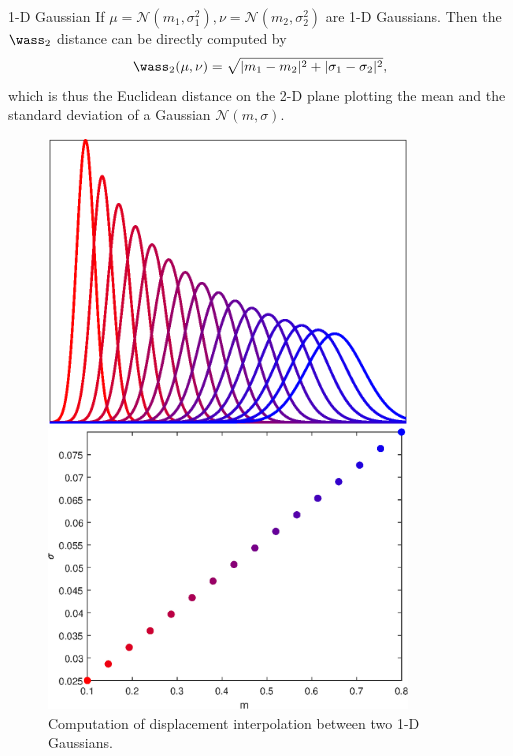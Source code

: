 \begin{frame}{1-D Gaussian}
    \footnotesize
    If $\mu=\mathcal{N}(m_1,\sigma_1^2),\nu=\mathcal{N}(m_2,\sigma_2^2)$ are 1-D Gaussians.
    Then the $\wass_2$ distance can be directly computed by
    \begin{equation}
        \wass_2(\mu,\nu) = \sqrt{|m_1-m_2|^2 + |\sigma_1-\sigma_2|^2},
    \end{equation}
    which is thus the Euclidean distance on the 2-D plane 
    plotting the mean and the standard deviation of a Gaussian $\mathcal{N}(m, \sigma)$.

    \begin{figure}
        \captionsetup{font=scriptsize}
        \begin{minipage}[c]{0.48\linewidth}
            \vspace{0pt}
            \centering
            \includegraphics[width=0.85\textwidth]{png/1d-gaussian/interp-density.eps}
        \end{minipage}
        \hfill
        \begin{minipage}[c]{0.48\linewidth}
            \vspace{0pt}
            \centering
            \includegraphics[width=0.85\textwidth]{png/1d-gaussian/plane.eps}
        \end{minipage}
        \caption{Computation of displacement interpolation between two 1-D Gaussians.}
    \end{figure}


\end{frame}
